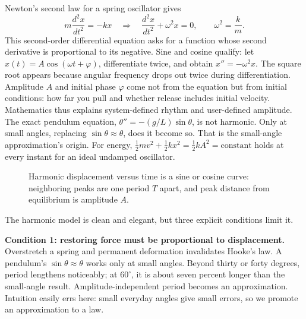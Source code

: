 \begin{mathbridge}
Newton's second law for a spring oscillator gives
\[
  m\frac{d^{2}x}{dt^{2}}=-kx
  \quad\Longrightarrow\quad
  \frac{d^{2}x}{dt^{2}}+\omega^{2}x=0,
  \qquad \omega^{2}=\frac{k}{m}.
\]
This second-order differential equation asks for a function whose second derivative is proportional to its negative. Sine and cosine qualify: let \(x(t)=A\cos(\omega t+\varphi)\), differentiate twice, and obtain \(x''=-\omega^{2}x\). The square root appears because angular frequency drops out twice during differentiation. Amplitude \(A\) and initial phase \(\varphi\) come not from the equation but from initial conditions: how far you pull and whether release includes initial velocity. Mathematics thus explains system-defined rhythm and user-defined amplitude. The exact pendulum equation, \(\theta''=-(g/L)\sin\theta\), is not harmonic. Only at small angles, replacing \(\sin\theta\approx\theta\), does it become so. That is the small-angle approximation's origin. For energy, \(\frac12 mv^{2}+\frac12 kx^{2}=\frac12 kA^{2}=\text{constant}\) holds at every instant for an ideal undamped oscillator.
\end{mathbridge}

\begin{figure}[htbp]
\centering
{}
\caption{Harmonic displacement versus time is a sine or cosine curve: neighboring peaks are one period \(T\) apart, and peak distance from equilibrium is amplitude \(A\).}
\end{figure}


The harmonic model is clean and elegant, but three explicit conditions limit it.

\textbf{Condition 1: restoring force must be proportional to displacement.} Overstretch a spring and permanent deformation invalidates Hooke's law. A pendulum's \(\sin\theta\approx\theta\) works only at small angles. Beyond thirty or forty degrees, period lengthens noticeably; at \(60^{\circ}\), it is about seven percent longer than the small-angle result. Amplitude-independent period becomes an approximation. Intuition easily errs here: small everyday angles give small errors, so we promote an approximation to a law.

